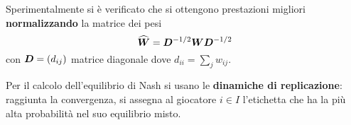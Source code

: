 Sperimentalmente si è verificato che si ottengono prestazioni migliori \textbf{normalizzando} la matrice dei pesi
\begin{displaymath}
	\widehat{\mat{W}} = \mat{D}^{-1/2} \mat{W} \mat{D}^{-1/2}
\end{displaymath}
con $\mat{D} = (d_{ij})$ matrice diagonale dove $d_{ii} = \sum_j w_{ij}$.

Per il calcolo dell'equilibrio di Nash si usano le \textbf{dinamiche di replicazione}: raggiunta la convergenza, si assegna al giocatore $i \in I$ l'etichetta che ha la più alta probabilità nel suo equilibrio misto.
